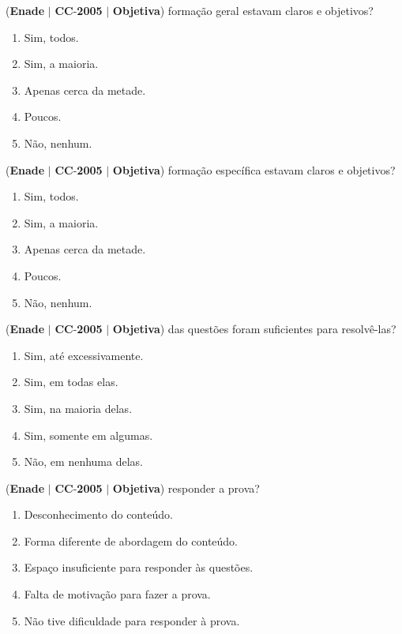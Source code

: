 \documentclass{exam}
\begin{document}
\begin{questions}
\question (\textbf{Enade} $|$ \textbf{CC}-\textbf{2005} $|$ \textbf{Objetiva})
formação geral estavam claros e objetivos?
	\begin{enumerate}[label=\alph*)]
		\item  Sim, todos.
		\item  Sim, a maioria.
		\item  Apenas cerca da metade.
		\item  Poucos.
		\item  Não, nenhum.
	\end{enumerate}

\question (\textbf{Enade} $|$ \textbf{CC}-\textbf{2005} $|$ \textbf{Objetiva})
formação específica estavam claros e objetivos?
	\begin{enumerate}[label=\alph*)]
		\item  Sim, todos.
		\item  Sim, a maioria.
		\item  Apenas cerca da metade.
		\item  Poucos.
		\item  Não, nenhum.
	\end{enumerate}

\question (\textbf{Enade} $|$ \textbf{CC}-\textbf{2005} $|$ \textbf{Objetiva})
das questões foram suficientes para resolvê-las?
	\begin{enumerate}[label=\alph*)]
		\item  Sim, até excessivamente.
		\item  Sim, em todas elas.
		\item  Sim, na maioria delas.
		\item  Sim, somente em algumas.
		\item  Não, em nenhuma delas.
	\end{enumerate}

\question (\textbf{Enade} $|$ \textbf{CC}-\textbf{2005} $|$ \textbf{Objetiva})
responder a prova?
	\begin{enumerate}[label=\alph*)]
		\item  Desconhecimento do conteúdo.
		\item  Forma diferente de abordagem do conteúdo.
		\item  Espaço insuficiente para responder às questões.
		\item  Falta de motivação para fazer a prova.
		\item  Não tive dificuldade para responder à prova.
	\end{enumerate}


\end{questions}
\end{document}
